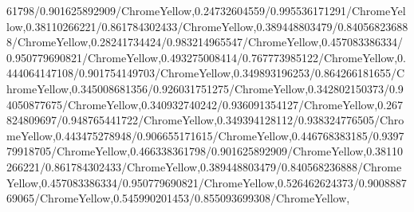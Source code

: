 {\begin{tikzternal}
{61798/0.901625892909/ChromeYellow,0.24732604559/0.995536171291/ChromeYellow,0.38110266221/0.861784302433/ChromeYellow,0.389448803479/0.840568236888/ChromeYellow,0.28241734424/0.983214965547/ChromeYellow,0.457083386334/0.950779690821/ChromeYellow,0.493275008414/0.767773985122/ChromeYellow,0.444064147108/0.901754149703/ChromeYellow,0.349893196253/0.864266181655/ChromeYellow,0.345008681356/0.926031751275/ChromeYellow,0.342802150373/0.94050877675/ChromeYellow,0.340932740242/0.936091354127/ChromeYellow,0.267824809697/0.948765441722/ChromeYellow,0.349394128112/0.938324776505/ChromeYellow,0.443475278948/0.906655171615/ChromeYellow,0.446768383185/0.939779918705/ChromeYellow,0.466338361798/0.901625892909/ChromeYellow,0.38110266221/0.861784302433/ChromeYellow,0.389448803479/0.840568236888/ChromeYellow,0.457083386334/0.950779690821/ChromeYellow,0.526462624373/0.900888769065/ChromeYellow,0.545990201453/0.855093699308/ChromeYellow,
}
\end{tikzternal}}
